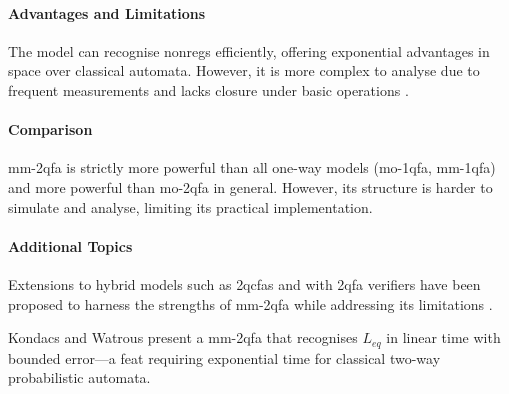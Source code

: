 \paragraph{Advantages and Limitations} The model can recognise non\glspl{reg} efficiently, offering exponential advantages in space over classical automata. However, it is more complex to analyse due to frequent measurements and lacks closure under basic operations \cite{kondacs1997power, qiu2008state}.

\paragraph{Comparison} \gls{mm-2qfa} is strictly more powerful than all one-way models (\gls{mo-1qfa}, \gls{mm-1qfa}) and more powerful than \gls{mo-2qfa} in general. However, its structure is harder to simulate and analyse, limiting its practical implementation.

\paragraph{Additional Topics} Extensions to hybrid models such as \glspl{2qcfa} and  with \gls{2qfa} verifiers have been proposed to harness the strengths of \gls{mm-2qfa} while addressing its limitations \cite{pani2011empowering, qiu2008state}.

\begin{example}
    Kondacs and Watrous \cite{kondacs1997power} present a \gls{mm-2qfa} that recognises $L_{eq}$ in linear time with bounded error—a feat requiring exponential time for classical two-way probabilistic automata.
\end{example}